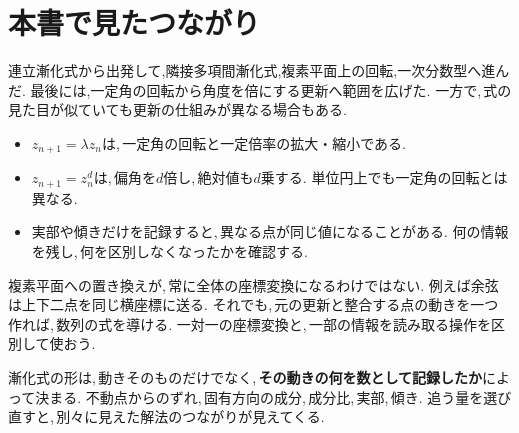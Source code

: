 \section{本書で見たつながり}\label{節：本書で見たつながり}

連立漸化式から出発して,隣接多項間漸化式,複素平面上の回転,一次分数型へ進んだ.
最後には,一定角の回転から角度を倍にする更新へ範囲を広げた.
一方で,\,式の見た目が似ていても更新の仕組みが異なる場合もある.

\begin{itemize}
 \item $z_{n+1}=\lambda z_n$は,\,一定角の回転と一定倍率の拡大・縮小である.
 \item $z_{n+1}=z_n^d$は,\,偏角を$d$倍し,\,絶対値も$d$乗する. 単位円上でも一定角の回転とは異なる.
 \item 実部や傾きだけを記録すると,\,異なる点が同じ値になることがある. 何の情報を残し,\,何を区別しなくなったかを確認する.
\end{itemize}

複素平面への置き換えが,\,常に全体の座標変換になるわけではない.
例えば余弦は上下二点を同じ横座標に送る.
それでも,\,元の更新と整合する点の動きを一つ作れば,\,数列の式を導ける.
一対一の座標変換と,\,一部の情報を読み取る操作を区別して使おう.

\begin{bookpoint}
漸化式の形は,\,動きそのものだけでなく,\,\textbf{その動きの何を数として記録したか}によって決まる.
不動点からのずれ,\,固有方向の成分,\,成分比,\,実部,\,傾き.
追う量を選び直すと,\,別々に見えた解法のつながりが見えてくる.
\end{bookpoint}
